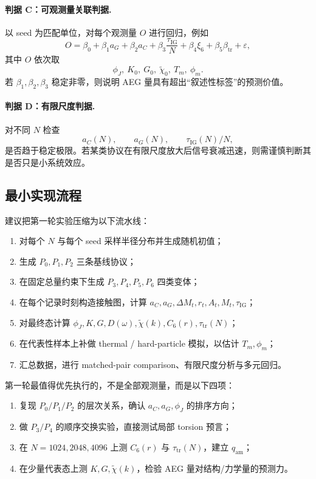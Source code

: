 \documentclass[12pt]{ctexart}
\newcommand{\IG}{\mathrm{IG}}
\newcommand{\tr}{\mathrm{tr}}
\begin{document}
\paragraph{判据 C：可观测量关联判据.}
以 seed 为匹配单位，对每个观测量 $O$ 进行回归，例如
\begin{equation}
O = \beta_0 + \beta_1 a_G + \beta_2 a_C + \beta_3 \frac{\tau_{\IG}}{N}
+ \beta_4 \xi_6 + \beta_5 \beta_{\tr} + \varepsilon,
\end{equation}
其中 $O$ 依次取
\begin{equation}
\phi_J,\ K_0,\ G_0,\ \tilde\chi_0,\ T_m,\ \phi_m.
\end{equation}
若 $\beta_1,\beta_2,\beta_3$ 稳定非零，则说明 AEG 量具有超出“叙述性标签”的预测价值。

\paragraph{判据 D：有限尺度判据.}
对不同 $N$ 检查
\begin{equation}
a_C(N),\qquad a_G(N),\qquad \tau_{\IG}(N)/N,
\end{equation}
是否趋于稳定极限。若某类协议在有限尺度放大后信号衰减迅速，则需谨慎判断其是否只是小系统效应。

\subsection{最小实现流程}

建议把第一轮实验压缩为以下流水线：
\begin{enumerate}
    \item 对每个 $N$ 与每个 seed 采样半径分布并生成随机初值；
    \item 生成 $P_0,P_1,P_2$ 三条基线协议；
    \item 在固定总量约束下生成 $P_3,P_4,P_5,P_6$ 四类变体；
    \item 在每个记录时刻构造接触图，计算 $a_C,a_G,\Delta M_t,r_t,A_t,M_t,\tau_{\IG}$；
    \item 对最终态计算 $\phi_J,K,G,D(\omega),\tilde\chi(k),C_6(r),\tau_{\tr}(N)$；
    \item 在代表性样本上补做 thermal / hard-particle 模拟，以估计 $T_m,\phi_m$；
    \item 汇总数据，进行 matched-pair comparison、有限尺度分析与多元回归。
\end{enumerate}

第一轮最值得优先执行的，不是全部观测量，而是以下四项：
\begin{enumerate}
    \item 复现 $P_0/P_1/P_2$ 的层次关系，确认 $a_C,a_G,\phi_J$ 的排序方向；
    \item 做 $P_3/P_4$ 的顺序交换实验，直接测试局部 torsion 预言；
    \item 在 $N=1024,2048,4096$ 上测 $C_6(r)$ 与 $\tau_{\tr}(N)$，建立 $q_{\mathrm{am}}$；
    \item 在少量代表态上测 $K,G,\tilde\chi(k)$，检验 AEG 量对结构/力学量的预测力。
\end{enumerate}
\end{document}
